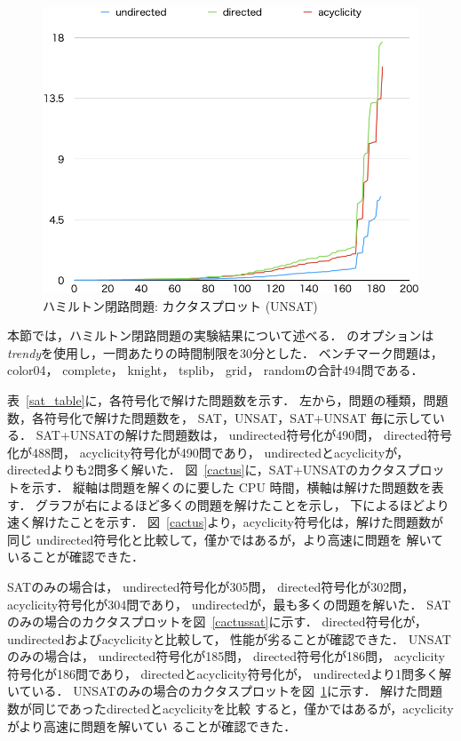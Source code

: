 \begin{figure}[tb]
\begin{center}
\includegraphics[width=0.6\linewidth]{fig/cactusunsat.png}
\caption{ハミルトン閉路問題: カクタスプロット (\textsf{UNSAT})}
\label{cactusunsat}
\end{center}
\end{figure}

本節では，ハミルトン閉路問題の実験結果について述べる．
{\clingo}のオプションは\textit{trendy}を使用し，一問あたりの時間制限を30分とした．
ベンチマーク問題は，
\textsf{color04}，
\textsf{complete}，
\textsf{knight}，
\textsf{tsplib}，
\textsf{grid}，
\textsf{random}の合計494問である．

表~\ref{sat_table}に，各符号化で解けた問題数を示す．
左から，問題の種類，問題数，各符号化で解けた問題数を，
\textsf{SAT}，\textsf{UNSAT}，\textsf{SAT+UNSAT}
毎に示している．
%
\textsf{SAT+UNSAT}の解けた問題数は，
\textsf{undirected}符号化が490問，
\textsf{directed}符号化が488問，
\textsf{acyclicity}符号化が490問であり，
\textsf{undirected}と\textsf{acyclicity}が，
\textsf{directed}よりも2問多く解いた．
図~\ref{cactus}に，\textsf{SAT+UNSAT}のカクタスプロットを示す．
縦軸は問題を解くのに要した CPU 時間，横軸は解けた問題数を表す．
グラフが右によるほど多くの問題を解けたことを示し，
下によるほどより速く解けたことを示す．
図~\ref{cactus}より，\textsf{acyclicity}符号化は，解けた問題数が同じ
\textsf{undirected}符号化と比較して，僅かではあるが，より高速に問題を
解いていることが確認できた．

\textsf{SAT}のみの場合は，
\textsf{undirected}符号化が305問，
\textsf{directed}符号化が302問，
\textsf{acyclicity}符号化が304問であり，
\textsf{undirected}が，最も多くの問題を解いた．
\textsf{SAT}のみの場合のカクタスプロットを図~\ref{cactussat}に示す．
\textsf{directed}符号化が，
\textsf{undirected}および\textsf{acyclicity}と比較して，
性能が劣ることが確認できた．
%
\textsf{UNSAT}のみの場合は，
\textsf{undirected}符号化が185問，
\textsf{directed}符号化が186問，
\textsf{acyclicity}符号化が186問であり，
\textsf{directed}と\textsf{acyclicity}符号化が，
\textsf{undirected}より1問多く解いている．
\textsf{UNSAT}のみの場合のカクタスプロットを図~\ref{cactusunsat}に示す．
解けた問題数が同じであった\textsf{directed}と\textsf{acyclicity}を比較
すると，僅かではあるが，\textsf{acyclicity}がより高速に問題を解いてい
ることが確認できた．

